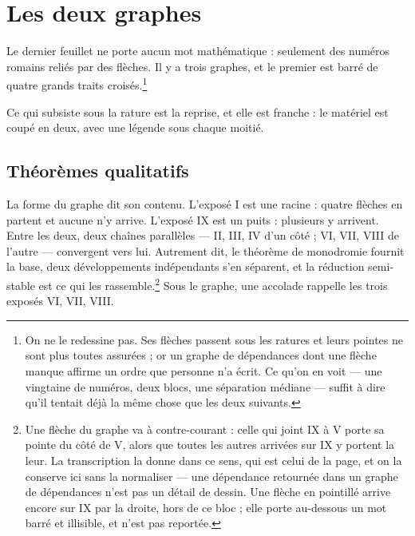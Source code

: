 \documentclass[11pt,a4paper]{article}
\begin{document}
\section*{Les deux graphes}

Le dernier feuillet ne porte aucun mot mathématique : seulement des numéros
romains reliés par des flèches. Il y a trois graphes, et le premier est barré de
quatre grands traits croisés.\footnote{On ne le redessine pas. Ses flèches
passent sous les ratures et leurs pointes ne sont plus toutes assurées ; or un
graphe de dépendances dont une flèche manque affirme un ordre que personne n'a
écrit. Ce qu'on en voit --- une vingtaine de numéros, deux blocs, une
séparation médiane --- suffit à dire qu'il tentait déjà la même chose que les
deux suivants.}

Ce qui subsiste sous la rature est la reprise, et elle est franche : le
matériel est coupé en deux, avec une légende sous chaque moitié.

\subsection*{Théorèmes qualitatifs}


La forme du graphe dit son contenu. L'exposé I est une racine : quatre flèches
en partent et aucune n'y arrive. L'exposé IX est un puits : plusieurs y
arrivent. Entre les deux, deux chaînes parallèles --- II, III, IV d'un côté ;
VI, VII, VIII de l'autre --- convergent vers lui. Autrement dit, le théorème de
monodromie fournit la base, deux développements indépendants s'en séparent, et
la réduction semi-stable est ce qui les rassemble.\footnote{Une flèche du graphe
va à contre-courant : celle qui joint IX à V porte sa pointe du côté de V, alors
que toutes les autres arrivées sur IX y portent la leur. La transcription la
donne dans ce sens, qui est celui de la page, et on la conserve ici sans la
normaliser --- une dépendance retournée dans un graphe de dépendances n'est pas
un détail de dessin. Une flèche en pointillé arrive encore sur IX par la
droite, hors de ce bloc ; elle porte au-dessous un mot barré et illisible, et
n'est pas reportée.} Sous le graphe, une accolade rappelle les trois exposés
VI, VII, VIII.
\end{document}
